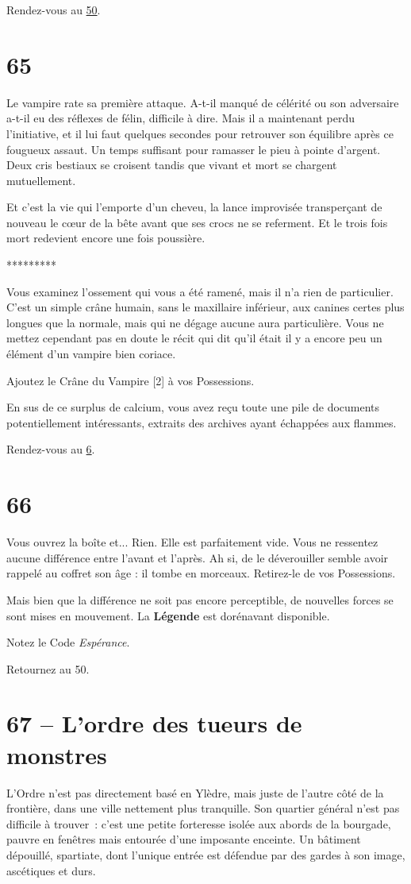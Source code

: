 \documentclass{report}
\newcommand{\gsection}[1]{
    \section{#1}
    \label{section-#1}
}
\newcommand{\glink}[1]{\hyperref[section-#1]{#1}}
\newcommand{\ellipse}{
    \begin{center}
        *********
    \end{center}
}
\newcommand{\hero}[1]{\textbf{#1}}
\begin{document}
Rendez-vous au \glink{50}.

\gsection{65}

Le vampire rate sa première attaque. A-t-il manqué de célérité ou son adversaire a-t-il eu des réflexes de félin, difficile à dire. Mais il a maintenant perdu l'initiative, et il lui faut quelques secondes pour retrouver son équilibre après ce fougueux assaut. Un temps suffisant pour ramasser le pieu à pointe d'argent. Deux cris bestiaux se croisent tandis que vivant et mort se chargent mutuellement.

Et c'est la vie qui l'emporte d'un cheveu, la lance improvisée transperçant de nouveau le cœur de la bête avant que ses crocs ne se referment. Et le trois fois mort redevient encore une fois poussière.

\ellipse

Vous examinez l'ossement qui vous a été ramené, mais il n'a rien de particulier. C'est un simple crâne humain, sans le maxillaire inférieur, aux canines certes plus longues que la normale, mais qui ne dégage aucune aura particulière. Vous ne mettez cependant pas en doute le récit qui dit qu'il était il y a encore peu un élément d'un vampire bien coriace.

Ajoutez le Crâne du Vampire [2] à vos Possessions.

En sus de ce surplus de calcium, vous avez reçu toute une pile de documents potentiellement intéressants, extraits des archives ayant échappées aux flammes.

Rendez-vous au \glink{6}.

\gsection{66}

Vous ouvrez la boîte et... Rien. Elle est parfaitement vide. Vous ne ressentez aucune différence entre l'avant et l'après. Ah si, de le déverouiller semble avoir rappelé au coffret son âge : il tombe en morceaux. Retirez-le de vos Possessions.

Mais bien que la différence ne soit pas encore perceptible, de nouvelles forces se sont mises en mouvement. La \hero{Légende} est dorénavant disponible.

Notez le Code \emph{Espérance}.

Retournez au 50.

\gsection{67 – L'ordre des tueurs de monstres}

L'Ordre n'est pas directement basé en Ylèdre, mais juste de l'autre côté de la frontière, dans une ville nettement plus tranquille. Son quartier général n'est pas difficile à trouver : c'est une petite forteresse isolée aux abords de la bourgade, pauvre en fenêtres mais entourée d'une imposante enceinte. Un bâtiment dépouillé, spartiate, dont l'unique entrée est défendue par des gardes à son image, ascétiques et durs.
\end{document}
